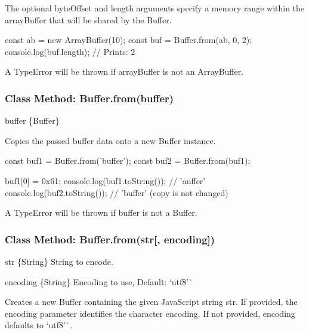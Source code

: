 The optional {\ttfamily byte\+Offset} and {\ttfamily length} arguments specify a memory range within the {\ttfamily array\+Buffer} that will be shared by the {\ttfamily Buffer}.


\begin{DoxyCode}
const ab = new ArrayBuffer(10);
const buf = Buffer.from(ab, 0, 2);
console.log(buf.length);
  // Prints: 2
\end{DoxyCode}


A {\ttfamily Type\+Error} will be thrown if {\ttfamily array\+Buffer} is not an {\ttfamily Array\+Buffer}.

\subsubsection*{Class Method\+: Buffer.\+from(buffer)}


\begin{DoxyItemize}
\item {\ttfamily buffer} \{Buffer\}
\end{DoxyItemize}

Copies the passed {\ttfamily buffer} data onto a new {\ttfamily Buffer} instance.


\begin{DoxyCode}
const buf1 = Buffer.from('buffer');
const buf2 = Buffer.from(buf1);

buf1[0] = 0x61;
console.log(buf1.toString());
  // 'auffer'
console.log(buf2.toString());
  // 'buffer' (copy is not changed)
\end{DoxyCode}


A {\ttfamily Type\+Error} will be thrown if {\ttfamily buffer} is not a {\ttfamily Buffer}.

\subsubsection*{Class Method\+: Buffer.\+from(str\mbox{[}, encoding\mbox{]})}


\begin{DoxyItemize}
\item {\ttfamily str} \{String\} String to encode.
\item {\ttfamily encoding} \{String\} Encoding to use, Default\+: `\textquotesingle{}utf8'\`{}
\end{DoxyItemize}

Creates a new {\ttfamily Buffer} containing the given Java\+Script string {\ttfamily str}. If provided, the {\ttfamily encoding} parameter identifies the character encoding. If not provided, {\ttfamily encoding} defaults to `\textquotesingle{}utf8'\`{}.


